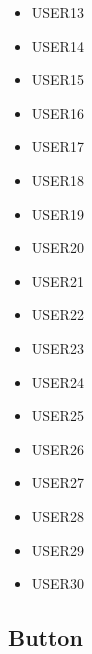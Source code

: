 \documentclass[english,bachelor,a4paper,twoside]{ppfcmthesis}
\begin{document}
\begin{itemize}
    \item USER13
    \item USER14
    \item USER15
    \item USER16
    \item USER17
    \item USER18
    \item USER19
    \item USER20
    \item USER21
    \item USER22
    \item USER23
    \item USER24
    \item USER25
    \item USER26
    \item USER27
    \item USER28
    \item USER29
    \item USER30
\end{itemize}

\subsection{Button} \label{subsec:button}
\end{document}

